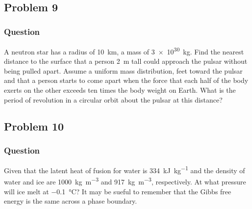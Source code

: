 \subsection{Problem 9}
\subsubsection{Question}
A neutron star has a radius of \SI{10}{\km}, a mass of \SI{3e30}{\kg}. Find the
nearest distance to the surface that a person \SI{2}{\m} tall could approach the
pulsar without being pulled apart. Assume a uniform mass distribution, feet
toward the pulsar and that a person starts to come apart when the force that
each half of the body exerts on the other exceeds ten times the body weight on
Earth. What is the period of revolution in a circular orbit about the pulsar at
this distance?

\clearpage
\subsection{Problem 10}
\subsubsection{Question}
Given that the latent heat of fusion for water is \SI{334}{\kilo\J\per\kg} and
the density of water and ice are \SI{1000}{\kg\per\m\cubed} and
\SI{917}{\kg\per\m\cubed}, respectively. At what pressure will ice melt at
\SI{-0.1}{\celsius}? It may be sueful to remember that the Gibbs free energy is
the same across a phase boundary.

